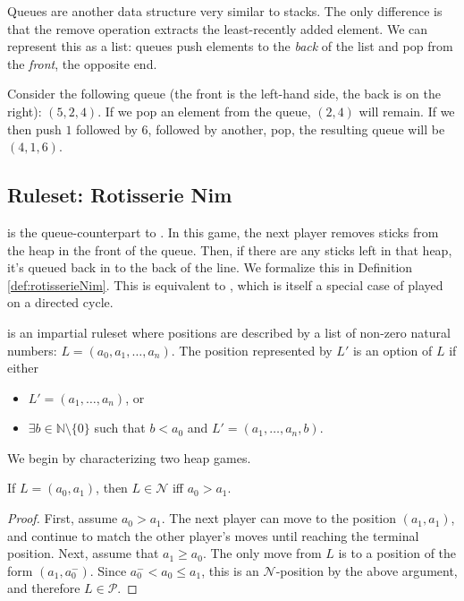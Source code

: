 \documentclass[letter,10pt]{article}
\begin{document}
Queues are another data structure very similar to stacks.  The only difference is that the remove operation extracts the least-recently added element.  We can represent this as a list:
queues push elements to the \emph{back} of the list and pop from the \emph{front}, the opposite end.

Consider the following queue (the front is the left-hand side, the back is on the right): $(5, 2, 4)$.  If we pop an element from the queue, $(2, 4)$ will remain.  If we then push $1$ followed by $6$, followed by another, pop, the resulting queue will be $(4, 1, 6)$.

\subsection{Ruleset: Rotisserie Nim}

 is the queue-counterpart to .  In this game, the next player removes sticks from the heap in the front of the queue.  Then, if there are any sticks left in that heap, it's queued back in to the back of the line.  We formalize this in Definition \ref{def:rotisserieNim}. This is equivalent to , which is itself a special case of  played on a directed cycle\cite{DBLP:journals/tcs/DucheneR14}. 



\begin{definition}
	\label{def:rotisserieNim}
	 is an impartial ruleset where positions are described by a list of non-zero natural numbers: $L = (a_0, a_1, \ldots, a_n)$.  The position represented by $L'$ is an option of $L$ if either
	\begin{itemize}
		\item  $L' = (a_1, \ldots, a_n)$, or
		\item  $\exists b \in \mathbb{N} \setminus \{0\}$ such that $b < a_0$ and $L' = (a_1, \ldots, a_n, b)$.
	\end{itemize}
\end{definition}



We begin by characterizing two heap games.

\begin{theorem}\label{thm:adjTwoHeaps}
If $L=(a_0,a_1)$, then $L\in \mathcal{N}$ iff $a_0>a_1$.
\end{theorem}
\begin{proof}
First, assume $a_0>a_1$. The next player can move to the position $(a_1,a_1)$, and continue to match the other player's moves until reaching the terminal position. Next, assume that $a_1\geq a_0$. The only move from $L$ is to a position of the form $(a_1,a_0^-)$. Since $a_0^-<a_0\leq a_1$, this is an $\mathcal{N}$-position by the above argument, and therefore $L\in \mathcal{P}$.
\end{proof}
\end{document}
